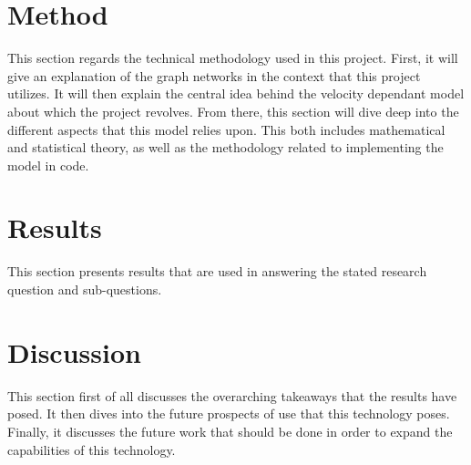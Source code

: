 \documentclass[11pt]{article}
\begin{document}

\clearpage



\section{Method}
\label{sec:Method}
This section regards the technical methodology used in this project.
First, it will give an explanation of the graph networks in the context that this project utilizes. 
It will then explain the central idea behind the velocity dependant model about which the project revolves. 
From there, this section will dive deep into the different aspects that this model relies upon.
This both includes mathematical and statistical theory, as well as the methodology related to implementing the model in code.











\clearpage


\clearpage

\section{Results}
\label{sec:Results}
This section presents results that are used in answering the stated research question and sub-questions.


\clearpage

\clearpage

\clearpage

\section{Discussion}
\label{sec:Discussion}
This section first of all discusses the overarching takeaways that the results have posed.
It then dives into the future prospects of use that this technology poses.
Finally, it discusses the future work that should be done in order to expand the capabilities of this technology.



\clearpage



\clearpage

%
%
\printbibliography
\clearpage


\end{document}
